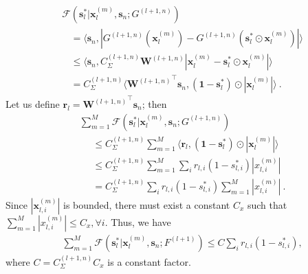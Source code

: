 \documentclass[10pt,twocolumn,letterpaper]{article}
\def\mb{\mathbf}
\begin{document}
\begin{align}
&\mathcal{F}(\mb s^*_l|\mb x^{(m)}_l,\mb s_n; G^{(l+1,n)})\nonumber\\
&~~~~=\langle\mb s_n, |G^{(l+1,n)}(\mb x^{(m)}_l)-G^{(l+1,n)}(\mb s^*_l\odot\mb x^{(m)}_l)|\rangle\\
&~~~~\le \langle\mb s_n, C_\Sigma^{(l+1,n)}\mb W^{(l+1,n)}|\mb x^{(m)}_l-\mb s^*_l\odot\mb x^{(m)}_l|\rangle\\
&~~~~=C_\Sigma^{(l+1,n)}\langle{\mb W^{(l+1,n)}}^\intercal\mb s_n, (\mb 1-\mb s^*_l)\odot  |\mb{x}^{(m)}_l|\rangle~.
\end{align}
Let us define $\mb r_l={\mb W^{(l+1,n)}}^\intercal\mb s_n$; then
\begin{align}
&\textstyle\sum_{m=1}^M \mathcal{F}(\mb s^*_l|\mb x^{(m)}_l,\mb s_n; G^{(l+1,n)})\nonumber\\
&\textstyle~~~~~~\le C_\Sigma^{(l+1,n)}\sum_{m=1}^M \langle\mb r_l,(\mb 1-\mb s^*_l)\odot|\mb x^{(m)}_l|\rangle\\
&\textstyle~~~~~~\le C_\Sigma^{(l+1,n)}\sum_{m=1}^M \sum_i r_{l,i}(1-s^*_{l,i})|x^{(m)}_{l,i}|\\
&\textstyle~~~~~~=C_\Sigma^{(l+1,n)}\sum_ir_{l,i}(1-s^*_{l,i})\sum_{m=1}^M|x^{(m)}_{l,i}|~.
\end{align}
Since $|\mb x^{(m)}_{l,i}|$ is bounded, there must exist a constant $C_x$ such that $\sum_{m=1}^M |x^{(m)}_{l,i}|\le C_x,\forall i$. Thus, we have
\begin{align}
&\sum_{m=1}^M \mathcal{F}(\mb s^*_l|\mb x^{(m)}_l,\mb s_n; F^{(l+1)})\le C\sum_ir_{l,i}(1-s^*_{l,i}),\label{eq:upbound}
\end{align}
where $C=C_\Sigma^{(l+1,n)}C_x$ is a constant factor.
\end{document}
